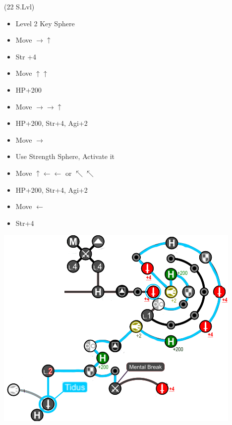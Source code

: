\begin{spheregrid}
  \begin{itemize}
    \tidusf (22 S.Lvl)
    \begin{itemize}
      \item Level 2 Key Sphere
      \item Move $\rightarrow\uparrow$
      \item Str +4
      \item Move $\uparrow\uparrow$
      \item HP+200
      \item Move $\rightarrow\rightarrow\uparrow$
      \item HP+200, Str+4, Agi+2
      \item Move $\rightarrow$
      \item Use Strength Sphere, Activate it
      \item Move $\uparrow\leftarrow\leftarrow$ or $\nwarrow\nwarrow$
      \item HP+200, Str+4, Agi+2
      \item Move $\leftarrow$
      \item Str+4
    \end{itemize}
    \includegraphics[width=.8\columnwidth]{graphics/Tidus_post_crawler}
  \end{itemize}
\end{spheregrid}
